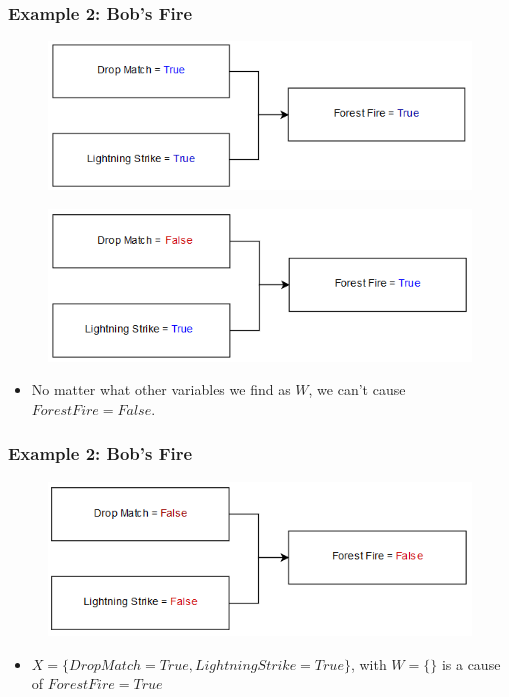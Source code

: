 \documentclass{beamer}
\theoremstyle{plain}
\theoremstyle{definition}
\begin{document}
\begin{frame}
\frametitle{Example 2: Bob's Fire}
\begin{figure}
\includegraphics[scale=.5]{bobModelReal}
\end{figure}

\begin{figure}
\includegraphics[scale=.5]{bobModelCounterfactual}
\end{figure}
\begin{itemize}
\item No matter what other variables we find as $W$, we can't cause $Forest Fire = False$.
\end{itemize}
\end{frame}



\begin{frame}
\frametitle{Example 2: Bob's Fire}
\begin{figure}
\includegraphics[scale=.5]{bobModelCounterFactual2}
\end{figure}

\begin{itemize}
\item $X=\{Drop Match=True, Lightning Strike = True\}$, with $W=\{\}$ is a cause of $Forest Fire = True$
\end{itemize}
\end{frame}
\end{document}
